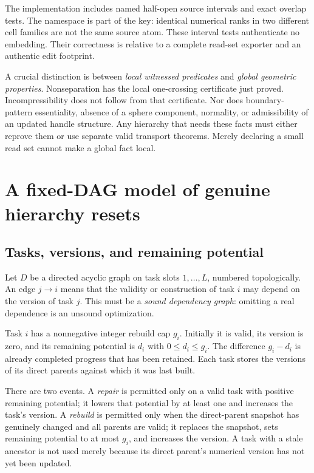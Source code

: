 \documentclass[11pt]{article}
\theoremstyle{definition}
\begin{document}
The implementation includes named half-open source intervals and exact overlap tests. The namespace is part of the key: identical numerical ranks in two different cell families are not the same source atom. These interval tests authenticate no embedding. Their correctness is relative to a complete read-set exporter and an authentic edit footprint.

A crucial distinction is between \emph{local witnessed predicates} and \emph{global geometric properties}. Nonseparation has the local one-crossing certificate just proved. Incompressibility does not follow from that certificate. Nor does boundary-pattern essentiality, absence of a sphere component, normality, or admissibility of an updated handle structure. Any hierarchy that needs these facts must either reprove them or use separate valid transport theorems. Merely declaring a small read set cannot make a global fact local.

\section{A fixed-DAG model of genuine hierarchy resets}\label{sec:causal}
\subsection{Tasks, versions, and remaining potential}
Let $D$ be a directed acyclic graph on task slots $1,\ldots,L$, numbered topologically. An edge $j\to i$ means that the validity or construction of task $i$ may depend on the version of task $j$. This must be a \emph{sound dependency graph}: omitting a real dependence is an unsound optimization.

Task $i$ has a nonnegative integer rebuild cap $g_i$. Initially it is valid, its version is zero, and its remaining potential is $d_i$ with $0\leq d_i\leq g_i$. The difference $g_i-d_i$ is already completed progress that has been retained. Each task stores the versions of its direct parents against which it was last built.

There are two events. A \emph{repair} is permitted only on a valid task with positive remaining potential; it lowers that potential by at least one and increases the task's version. A \emph{rebuild} is permitted only when the direct-parent snapshot has genuinely changed and all parents are valid; it replaces the snapshot, sets remaining potential to at most $g_i$, and increases the version. A task with a stale ancestor is not used merely because its direct parent's numerical version has not yet been updated.
\end{document}

